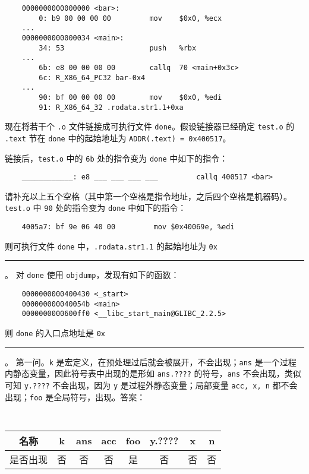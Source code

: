 \begin{problems}
        \begin{verbatim}
    0000000000000000 <bar>:
        0: b9 00 00 00 00         mov    $0x0, %ecx
    ...
    0000000000000034 <main>:
        34: 53                    push   %rbx
    ...
        6b: e8 00 00 00 00        callq  70 <main+0x3c>
        6c: R_X86_64_PC32 bar-0x4
    ...
        90: bf 00 00 00 00        mov    $0x0, %edi
        91: R_X86_64_32 .rodata.str1.1+0xa
        \end{verbatim}
        现在将若干个 \verb|.o| 文件链接成可执行文件 \verb|done|。假设链接器已经确定 \verb|test.o| 的 \verb|.text| 节在 \verb|done| 中的起始地址为 \verb|ADDR(.text) = 0x400517|。

        \subqn 链接后，\verb|test.o| 中的 \verb|6b| 处的指令变为 \verb|done| 中如下的指令：
        \begin{verbatim}
    ____________: e8 ___ ___ ___ ___         callq 400517 <bar>
        \end{verbatim}
        请补充以上五个空格（其中第一个空格是指令地址，之后四个空格是机器码）。
        \subqn \verb|test.o| 中 \verb|90| 处的指令变为 \verb|done| 中如下的指令：
        \begin{verbatim}
    4005a7: bf 9e 06 40 00         mov $0x40069e, %edi
        \end{verbatim}
        则可执行文件 \verb|done| 中，\verb|.rodata.str1.1| 的起始地址为 \verb|0x|\rule{2.5cm}{0.25mm}。
        \qn 对 \verb|done| 使用 \verb|objdump|，发现有如下的函数：
        \begin{verbatim}
    0000000000400430 <_start>
    000000000040054b <main>
    0000000000600ff0 <__libc_start_main@GLIBC_2.2.5>
        \end{verbatim}
        则 \verb|done| 的入口点地址是 \verb|0x|\rule{2.5cm}{0.25mm}。
        \sol 第一问。\verb|k| 是宏定义，在预处理过后就会被展开，不会出现；\verb|ans| 是一个过程内静态变量，因此符号表中出现的是形如 \verb|ans.????| 的符号，\verb|ans| 不会出现，类似可知 \verb|y.????| 不会出现，因为 \verb|y| 是过程外静态变量；局部变量 \verb|acc, x, n| 都不会出现；\verb|foo| 是全局符号，出现。答案：
        \begin{table}[H]
            \tt
            \centering
            \begin{tabular}{|c|c|c|c|c|c|c|c|}
                \hline
                名称 & k & ans & acc & foo & y.???? & x & n \\ \hline
                是否出现 & 否 & 否 & 否 & 是 & 否 & 否 & 否 \\ \hline
            \end{tabular}
        \end{table}


\end{problems}
